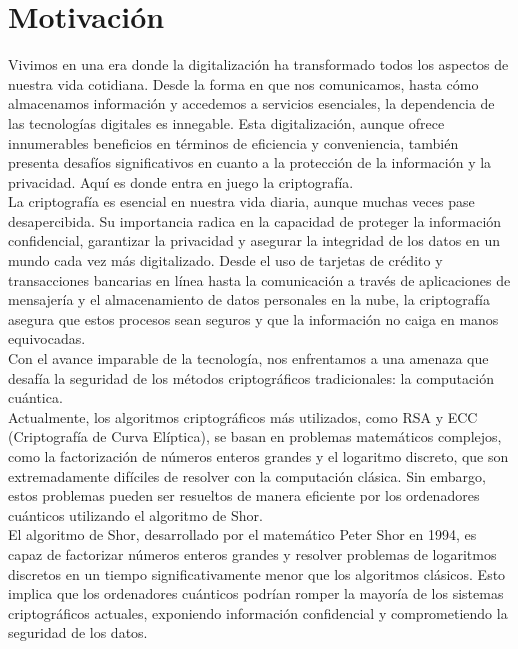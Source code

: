 
\chapter*{Motivación}
Vivimos en una era donde la digitalización ha transformado todos los aspectos de nuestra vida cotidiana. Desde la forma en que nos comunicamos, hasta cómo almacenamos información y accedemos a servicios esenciales, la dependencia de las tecnologías digitales es innegable. Esta digitalización, aunque ofrece innumerables beneficios en términos de eficiencia y conveniencia, también presenta desafíos significativos en cuanto a la protección de la información y la privacidad. Aquí es donde entra en juego la criptografía.\\

La criptografía es esencial en nuestra vida diaria, aunque muchas veces pase desapercibida. Su importancia radica en la capacidad de proteger la información confidencial, garantizar la privacidad y asegurar la integridad de los datos en un mundo cada vez más digitalizado. Desde el uso de tarjetas de crédito y transacciones bancarias en línea hasta la comunicación a través de aplicaciones de mensajería y el almacenamiento de datos personales en la nube, la criptografía asegura que estos procesos sean seguros y que la información no caiga en manos equivocadas.\\

Con el avance imparable de la tecnología, nos enfrentamos a una amenaza que desafía la seguridad de los métodos criptográficos tradicionales: la computación cuántica. \\

Actualmente, los algoritmos criptográficos más utilizados, como RSA y ECC (Criptografía de Curva Elíptica), se basan en problemas matemáticos complejos, como la factorización de números enteros grandes y el logaritmo discreto, que son extremadamente difíciles de resolver con la computación clásica. Sin embargo, estos problemas pueden ser resueltos de manera eficiente por los ordenadores cuánticos utilizando el algoritmo de Shor.\\

El algoritmo de Shor, desarrollado por el matemático Peter Shor en 1994, es capaz de factorizar números enteros grandes y resolver problemas de logaritmos discretos en un tiempo significativamente menor que los algoritmos clásicos. Esto implica que los ordenadores cuánticos podrían romper la mayoría de los sistemas criptográficos actuales, exponiendo información confidencial y comprometiendo la seguridad de los datos.\\


